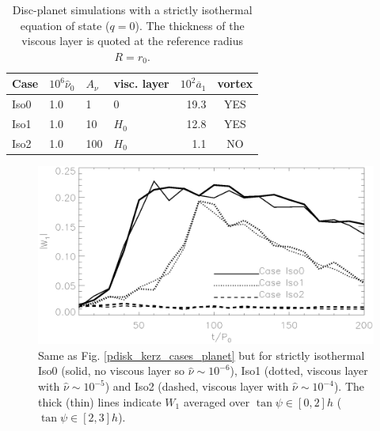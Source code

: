 \begin{table}
  \centering
  \caption{Disc-planet simulations with a strictly
    isothermal equation of state ($q=0$). The thickness of the viscous layer
    is quoted at the reference radius $R=r_0$. \label{planet_sims_iso}}
    \begin{tabular}{llllrc}
      \hline\hline
      Case & $10^6\hat{\nu}_0$ & $A_\nu$ & visc. layer& $10^2\overline{a}_1$ &vortex \\ 
      \hline
      Iso0   & 1.0  & 1          & 0      & 19.3  &  YES   \\
      Iso1   & 1.0  & 10         & $H_0$  & 12.8  &  YES     \\ 
      Iso2   & 1.0  & 100        & $H_0$  & 1.1  &  NO     \\ 
      \hline
  \end{tabular}
\end{table}


\begin{figure}
  \centering
  \includegraphics[width=\linewidth]{figures/pdisk_kerz_cases_iso}
  \caption{Same as Fig. \ref{pdisk_kerz_cases_planet} but for strictly
    isothermal Iso0 (solid, no viscous layer so $\hat{\nu}\sim10^{-6}$), Iso1
    (dotted, viscous layer with $\hat{\nu}\sim10^{-5}$) and Iso2
    (dashed, viscous layer with $\hat{\nu}\sim10^{-4}$). The thick (thin) lines indicate
    $W_1$ averaged over $\tan{\psi}\in[0,2]h$
    ($\tan{\psi}\in[2,3]h$).  
    \label{pdisk_kerz_cases_planet_iso}}
\end{figure}
